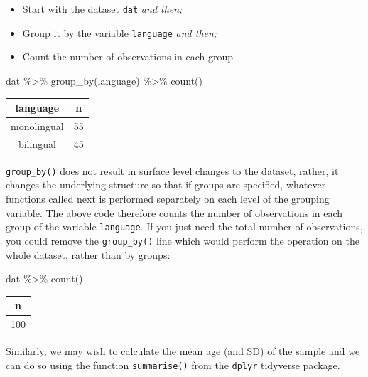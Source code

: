 \documentclass[
  english,
  doc,floatsintext]{apa6}
\newenvironment{Shaded}{\begin{snugshade}}{\end{snugshade}}
\newcommand{\FunctionTok}[1]{\textcolor[rgb]{0.00,0.00,0.00}{#1}}
\newcommand{\NormalTok}[1]{#1}
\newcommand{\SpecialCharTok}[1]{\textcolor[rgb]{0.00,0.00,0.00}{#1}}
\begin{document}
\begin{itemize}
\item
  Start with the dataset \texttt{dat} \emph{and then;}
\item
  Group it by the variable \texttt{language} \emph{and then;}
\item
  Count the number of observations in each group
\end{itemize}

\begin{Shaded}
\begin{Highlighting}[]
\NormalTok{dat }\SpecialCharTok{\%\textgreater{}\%}
  \FunctionTok{group\_by}\NormalTok{(language) }\SpecialCharTok{\%\textgreater{}\%}
  \FunctionTok{count}\NormalTok{()}
\end{Highlighting}
\end{Shaded}

\begin{tabular}{c|c}
\hline
language & n\\
\hline
monolingual & 55\\
\hline
bilingual & 45\\
\hline
\end{tabular}

\texttt{group\_by()} does not result in surface level changes to the dataset, rather, it changes the underlying structure so that if groups are specified, whatever functions called next is performed separately on each level of the grouping variable. The above code therefore counts the number of observations in each group of the variable \texttt{language}. If you just need the total number of observations, you could remove the \texttt{group\_by()} line which would perform the operation on the whole dataset, rather than by groups:

\begin{Shaded}
\begin{Highlighting}[]
\NormalTok{dat }\SpecialCharTok{\%\textgreater{}\%}
  \FunctionTok{count}\NormalTok{()}
\end{Highlighting}
\end{Shaded}

\begin{tabular}{c}
\hline
n\\
\hline
100\\
\hline
\end{tabular}

Similarly, we may wish to calculate the mean age (and SD) of the sample and we can do so using the function \texttt{summarise()} from the \texttt{dplyr} tidyverse package.
\end{document}
